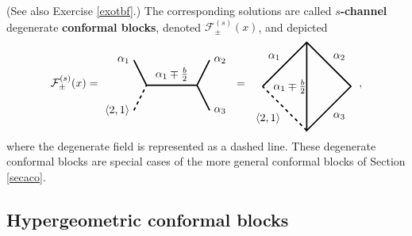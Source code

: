\documentclass[12pt,a4paper,notitlepage]{report}
\numberwithin{equation}{section}
\theoremstyle{break}
\begin{document}
(See also Exercise \ref{exotbf}.) The corresponding solutions are called \textbf{\boldmath $s$-channel} degenerate \textbf{conformal blocks}, denoted $\mathcal{F}^{(s)}_\pm(x)$, and depicted
\begin{align}
 \mathcal{F}^{(s)}_\pm(x)  =  
 \begin{tikzpicture}[baseline=(current  bounding  box.center), very thick, scale = .4]
\draw (-1,2) node [left] {$\alpha_1$} -- (0,0) -- node [above] {$\alpha_1\mp \frac{b}{2}$} (4,0) -- (5,2) node [right] {$\alpha_2$};
\draw[dashed] (-1,-2) node [left] {$\langle 2,1 \rangle$} -- (0,0);
\draw (4,0) -- (5,-2) node [right] {$\alpha_3$};
\end{tikzpicture}
\ =\ 
\begin{tikzpicture}[baseline=(current  bounding  box.center), very thick, scale = .7]
\draw[dashed] (0, -2) -- node [below left] {$\langle 2,1 \rangle$} (-2, 0); 
\draw (-2, 0) -- node [above left] {$\alpha_1$} (0, 2) -- node [above right] {$\alpha_2$} (2, 0) -- node [below right] {$\alpha_3$} (0, -2) -- node [left] {$\alpha_1\mp \frac{b}{2}\! \! $} (0, 2); 
\end{tikzpicture}
\  \ ,
\label{gpic}
\end{align}
where the degenerate field is represented as a dashed line.
These degenerate conformal blocks are special cases of the more general conformal blocks of Section \ref{secaco}.


\subsection{Hypergeometric conformal blocks \label{sechcb}}
\end{document}
